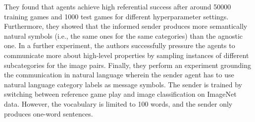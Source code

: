 They found that agents achieve high referential success after around 50000 training games and 1000 test games for different hyperparameter settings. Furthermore, they showed that the informed sender produces more semantically natural symbols (i.e., the same ones for the same categories) than the agnostic one. In a further experiment, the authors successfully pressure the agents to communicate more about high-level properties by sampling instances of different subcategories for the image pairs.%
Finally, they perform an experiment grounding the communication in natural language wherein the sender agent has to use natural language category labels as message symbols. The sender is trained by switching between reference game play and image classification on ImageNet data. However, the vocabulary is limited to 100 words, and the sender only produces one-word sentences. %
	
